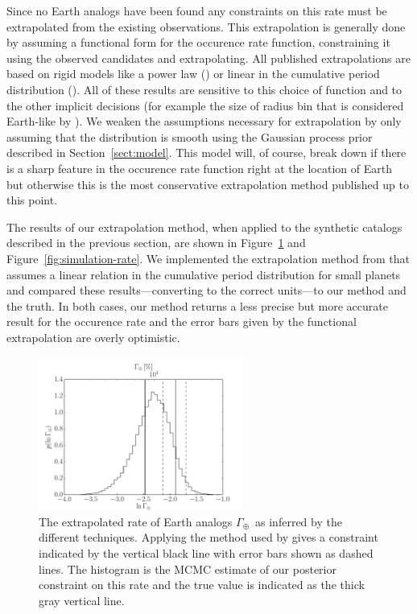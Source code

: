 \documentclass[12pt,preprint]{aastex}
\newcommand{\Fig}[1]{Figure~\ref{fig:#1}}
\newcommand{\fig}[1]{\Fig{#1}}
\newcommand{\figlabel}[1]{\label{fig:#1}}
\newcommand{\Sect}[1]{Section~\ref{sect:#1}}
\newcommand{\sect}[1]{\Sect{#1}}
\newcommand{\rate}{\ensuremath{\Gamma}}
\newcommand{\gammaearth}{{\ensuremath{\rate_\oplus}}}
\begin{document}
Since no Earth analogs have been found any constraints on this rate must be
extrapolated from the existing observations.
This extrapolation is generally done by assuming a functional form for the
occurence rate function, constraining it using the observed candidates and
extrapolating.
All published extrapolations are based on rigid models like a power law
(\citealt{catanzarite, traub}) or linear in the cumulative period distribution
(\citealt{petigura}).
All of these results are sensitive to this choice of function and to the other
implicit decisions (for example the size of radius bin that is considered
Earth-like by \citealt{petigura}).
We weaken the assumptions necessary for extrapolation by only assuming that
the distribution is smooth using the Gaussian process prior described in
\sect{model}.
This model will, of course, break down if there is a sharp feature in the
occurence rate function right at the location of Earth but otherwise this is
the most conservative extrapolation method published up to this point.

The results of our extrapolation method, when applied to the synthetic
catalogs described in the previous section, are shown in \fig{smooth-rate} and
\fig{simulation-rate}.
We implemented the extrapolation method from \citet{petigura} that assumes a
linear relation in the cumulative period distribution for small planets and
compared these results---converting to the correct units---to our method and
the truth.
In both cases, our method returns a less precise but more accurate result for
the occurence rate and the error bars given by the functional extrapolation
are overly optimistic.

\begin{figure}[p]
\begin{center}
\includegraphics[width=0.6\textwidth]{figures/smooth/rate.pdf}
\end{center}
\caption{%
The extrapolated rate of Earth analogs \gammaearth\ as inferred by the
different techniques.
Applying the method used by \citet{petigura} gives a constraint indicated by
the vertical black line with error bars shown as dashed lines.
The histogram is the MCMC estimate of our posterior constraint on this rate
and the true value is indicated as the thick gray vertical line.
\figlabel{smooth-rate}}
\end{figure}
\end{document}
